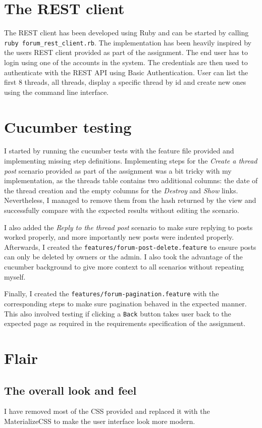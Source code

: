 \documentclass[a4paper, 11pt, titlepage]{article}
\begin{document}
\section{The REST client}
The REST client has been developed using Ruby and can be started by calling \texttt{ruby forum\_rest\_client.rb}.
The implementation has been heavily inspired by the users REST client provided as part of the assignment.
The end user has to login using one of the accounts in the system. The credentials are then used to authenticate
with the REST API using Basic Authentication. User can list the first 8 threads, all threads, display a specific
thread by id and create new ones using the command line interface.

\section{Cucumber testing}
I started by running the cucumber tests with the feature file provided and implementing
missing step definitions. Implementing steps for the \textit{Create a thread post} scenario
provided as part of the assignment was a bit tricky with my implementation, as the
threads table contains two additional columns: the date of the thread creation and the
empty columns for the \textit{Destroy} and \textit{Show} links. Nevertheless, I managed to
remove them from the hash returned by the view and successfully compare with the expected
results without editing the scenario.

I also added the \textit{Reply to the thread post} scenario to make sure replying to
posts worked properly, and more importantly new posts were indented properly. Afterwards,
I created the \texttt{features/forum-post-delete.feature} to ensure posts can only be deleted
by owners or the admin. I also took the advantage of the cucumber background to give
more context to all scenarios without repeating myself.

Finally, I created the \texttt{features/forum-pagination.feature} with the corresponding
steps to make sure pagination behaved in the expected manner. This also involved testing
if clicking a \texttt{Back} button takes user back to the expected page as required in the
requirements specification of the assignment.

\section{Flair}
\subsection{The overall look and feel}
I have removed most of the CSS provided and replaced it with the MaterializeCSS\cite{1}
to make the user interface look more modern.
\end{document}
